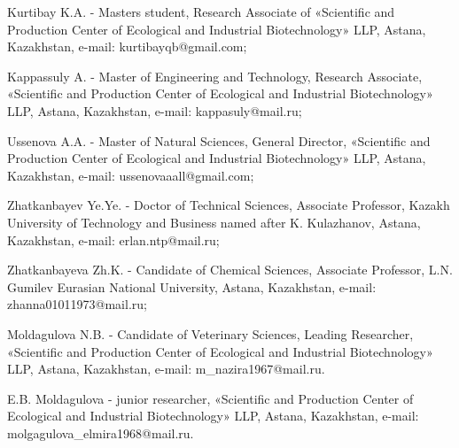 Kurtibay K.A. - Master\textquotesingle s student, Research Associate of
«Scientific and Production Center of Ecological and Industrial
Biotechnology» LLP, Astana, Kazakhstan, e-mail: kurtibayqb@gmail.com;

Kappassuly A. - Master of Engineering and Technology, Research
Associate, «Scientific and Production Center of Ecological and
Industrial Biotechnology» LLP, Astana, Kazakhstan, e-mail:
kappasuly@mail.ru;

Ussenova A.A. - Master of Natural Sciences, General Director,
«Scientific and Production Center of Ecological and Industrial
Biotechnology» LLP, Astana, Kazakhstan, e-mail: ussenovaaall@gmail.com;

Zhatkanbayev Ye.Ye. - Doctor of Technical Sciences, Associate Professor,
Kazakh University of Technology and Business named after K. Kulazhanov,
Astana, Kazakhstan, e-mail: erlan.ntp@mail.ru;

Zhatkanbayeva Zh.K. - Candidate of Chemical Sciences, Associate
Professor, L.N. Gumilev Eurasian National University, Astana,
Kazakhstan, e-mail: zhanna01011973@mail.ru;

Moldagulova N.B. - Candidate of Veterinary Sciences, Leading Researcher,
«Scientific and Production Center of Ecological and Industrial
Biotechnology» LLP, Astana, Kazakhstan, e-mail: m\_nazira1967@mail.ru.

E.B. Moldagulova - junior researcher, «Scientific and Production Center
of Ecological and Industrial Biotechnology» LLP, Astana, Kazakhstan,
e-mail: molgagulova\_elmira1968@mail.ru.
